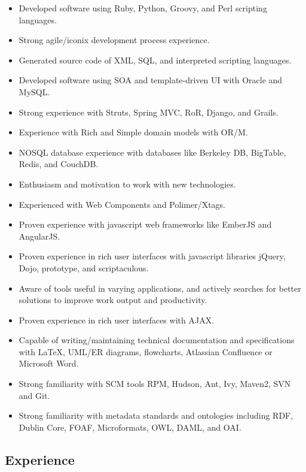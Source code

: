\documentclass[10pt,letterpaper]{article}
\begin{document}
\begin{itemize}
\item Developed software using Ruby, Python, Groovy, and Perl scripting languages.
\item Strong agile/iconix development process experience.
\item Generated source code of XML, SQL, and interpreted scripting languages.
\item Developed software using SOA and template-driven UI with Oracle and MySQL.
\item Strong experience with Struts, Spring MVC, RoR, Django, and Grails.
\item Experience with Rich and Simple domain models with OR/M.
\item NOSQL database experience with databases like Berkeley DB, BigTable, Redis, and CouchDB.
\item Enthusiasm and motivation to work with new technologies.
\item Experienced with Web Components and Polimer/Xtags.
\item Proven experience with javascript web frameworks like EmberJS and AngularJS.
\item Proven experience in rich user interfaces with javascript libraries jQuery, Dojo, 
  prototype, and scriptaculous.
\item Aware of tools useful in varying applications, and actively
  searches for better solutions to improve work output and productivity.
\item Proven experience in rich user interfaces with AJAX.
\item Capable of writing/maintaining technical documentation and
  specifications with LaTeX, UML/ER diagrams, flowcharts, Atlassian Confluence or Microsoft Word.
\item Strong familiarity with SCM tools RPM, Hudson, Ant, Ivy, Maven2, SVN and Git.
\item Strong familiarity with metadata standards and ontologies
  including RDF, Dublin Core, FOAF, Microformats, OWL, DAML, and OAI.
\end{itemize}

\subsection*{Experience}
\end{document}
